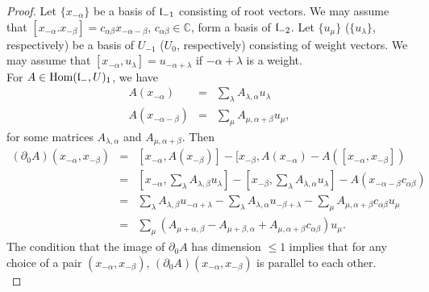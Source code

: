 \documentclass[12pt]{amsart}
\theoremstyle{plain}
\theoremstyle{definition}
\def\Hom{\operatorname{Hom}}
\begin{document}
\begin{proof}
Let $\{x_{-\alpha}\}$ be a basis of $\frak l_{-1}$ consisting of root vectors.  We may assume that $[x_{-\alpha}. x_{-\beta}]=c_{\alpha \beta}x_{-\alpha-\beta}$, $c_{\alpha \beta} \in \mathbb C$,  form a basis of $\frak l_{-2}$.
 Let $\{u_{\mu}\}$ ($\{u_{\lambda}\}$, respectively) be a basis of $U_{-1}$ ($U_0$, respectively) consisting of weight vectors. We may assume that $[x_{-\alpha}, u_{\lambda}] = u_{-\alpha+\lambda}$ if $-\alpha + \lambda$ is a weight.\\

    For $A \in \Hom(\frak l_{-}, U)_1$, we have
 \begin{eqnarray*}
 A(x_{-\alpha}) &=& \sum_{\lambda} A_{\lambda, \alpha} u_{\lambda} \\
 A(x_{-\alpha -\beta})&=& \sum_{\mu}A_{\mu, \alpha+\beta} u_{\mu},
 \end{eqnarray*}
 for  some matrices $A_{\lambda, \alpha}$ and $A_{\mu, \alpha+\beta}$.
 Then
 \begin{eqnarray*}
 (\partial_0A)(x_{-\alpha}, x_{-\beta}) &=&[x_{-\alpha}, A(x_{-\beta})] - [x_{-\beta}, A(x_{-\alpha}) - A([x_{-\alpha}, x_{-\beta}]) \\
&=& [x_{-\alpha}, \sum_{\lambda} A_{\lambda, \beta}u_{\lambda}] -[x_{-\beta}, \sum_{\lambda}A_{\lambda, \alpha}u_{\lambda}] -  A(x_{-\alpha-\beta}c_{\alpha \beta})  \\
&=& \sum_{\lambda} A_{\lambda, \beta} u_{-\alpha+\lambda} - \sum_{\lambda} A_{\lambda, \alpha} u_{-\beta+\lambda}- \sum_{\mu} A_{\mu, \alpha+\beta}c_{\alpha \beta} u_{\mu} \\
&=&\sum_{\mu}  \left( A_{\mu+ \alpha, \beta} - A_{\mu+\beta, \alpha} + A_{\mu, \alpha+\beta} c_{\alpha \beta}  \right) u_{\mu}.
 \end{eqnarray*}
The condition that the image of $\partial_0A $ has dimension $\leq 1$ implies that for any choice of a pair $(x_{-\alpha}, x_{-\beta})$, $(\partial_0A)(x_{-\alpha}, x_{-\beta})$ is parallel to each other. \\


\end{proof}
\end{document}
